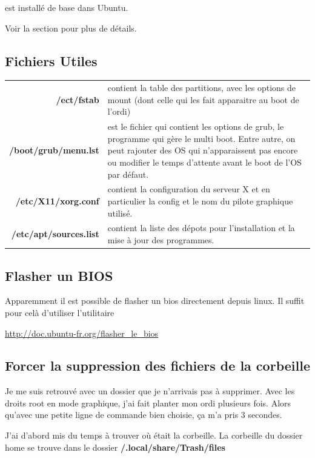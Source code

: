 \documentclass[a4paper,twoside]{article}
\begin{document}
\begin{remarque}
 est installé de base dans Ubuntu.
\end{remarque}

Voir la section  pour plus de détails.

\subsection{Fichiers Utiles}

\begin{tabular}{>{\bfseries}r<{}@{ : }p{9cm}}
/ect/fstab & contient la table des partitions, avec les options de mount (dont celle qui les fait apparaitre au boot de l'ordi) \\
/boot/grub/menu.lst & est le fichier qui contient les options de grub, le programme qui gère le multi boot. Entre autre, on peut rajouter des OS qui n'apparaissent pas encore ou modifier le temps d'attente avant le boot de l'OS par défaut.\\
/etc/X11/xorg.conf & contient la configuration du serveur X et en particulier la config et le nom du pilote graphique utilisé.\\
/etc/apt/sources.list & contient la liste des dépots pour l'installation et la mise à jour des programmes.\\
\end{tabular}

\subsection{Flasher un BIOS}
Apparemment il est possible de flasher un bios directement depuis linux. Il suffit pour celà d'utiliser l'utilitaire 

\url{http://doc.ubuntu-fr.org/flasher_le_bios}

\subsection{Forcer la suppression des fichiers de la corbeille}
Je me suis retrouvé avec un dossier que je n'arrivais pas à supprimer. Avec les droits root en mode graphique, j'ai fait planter mon ordi plusieurs fois. Alors qu'avec une petite ligne de commande bien choisie, ça m'a pris 3 secondes.

J'ai d'abord mis du temps à trouver où était la corbeille. La corbeille du dossier home se trouve dans le dossier \textbf{\texttildelow/.local/share/Trash/files}
\end{document}
